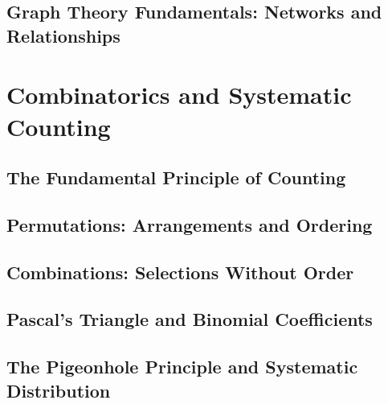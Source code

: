 \documentclass[12pt, oneside, openany]{book}
\begin{document}
\section{Graph Theory Fundamentals: Networks and Relationships}


\chapter{Combinatorics and Systematic Counting}

\section{The Fundamental Principle of Counting}

\section{Permutations: Arrangements and Ordering}

\section{Combinations: Selections Without Order}

\section{Pascal's Triangle and Binomial Coefficients}

\section{The Pigeonhole Principle and Systematic Distribution}
\end{document}
